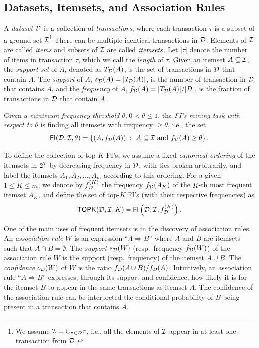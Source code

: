 \subsection{Datasets, Itemsets, and Association Rules}\label{sec:preldm}
A
\emph{dataset} ${\cal D}$ is a collection of \emph{transactions}, where each
transaction $\tau$ is a subset of a ground set ${\cal I}$\footnote{We assume
${\cal I}=\cup_{\tau\in{\cal D}} \tau$, i.e., all the elements of ${\cal I}$ appear in at
least one transaction from ${\cal D}$.} There can be multiple
identical transactions in ${\cal D}$. Elements of ${\cal I}$ are called \emph{items} and
subsets of ${\cal I}$ are called $\emph{itemsets}$. Let $|\tau|$ denote the number
of items in transaction $\tau$, which we call the \emph{length} of $\tau$. Given
an itemset $A\subseteq{\cal I}$, the \emph{support set} of $A$, denoted as
$T_{\cal D}(A)$, is the set of transactions in ${\cal D}$ that contain $A$. The
\emph{support} of $A$, $s_{\cal D}(A) =|T_{\cal D}(A)|$, is the number of transaction
in ${\cal D}$ that contains $A$, and the \emph{frequency} of $A$, $f_{\cal D}(A)=
|T_{\cal D}(A)|/|{\cal D}|$, is the fraction of transactions in ${\cal D}$ that contain
$A$.
\begin{definition}\label{def:minethreshold}
  Given a \emph{minimum frequency
  threshold} $\theta$, $0<\theta\le 1$, the \emph{FI's mining task with respect
  to $\theta$} is finding all itemsets with frequency $\geq\theta$, i.e., the
  set 
  \[ \mathsf{FI}({\cal D},{\cal I},\theta)=\left\{(A,f_{\cal D}(A)) ~:~ A \subseteq{\cal I} \mbox{ and }
  f_{{\cal D}}(A)\ge \theta\right\}.  \]
\end{definition}
  To define the collection of top-$K$ FI's, we assume a fixed \textit{canonical
  ordering} of the itemsets in $2^{\cal I}$ by decreasing frequency in ${\cal D}$, with
  ties broken arbitrarily, and label the itemsets $A_1,A_2,\dotsc,A_m$ according
  to this ordering.  For a given $1 \leq K \leq m$, we denote by
  $f^{(K)}_{\cal D}$ the frequency $f_{\cal D}(A_K)$ of the $K$-th most frequent itemset
  $A_K$, and define the set of top-$K$ FI's  (with their respective frequencies)
  as \[
  \mathsf{TOPK}({\cal D},{\cal I},K)= \mathsf{FI}\left({\cal D},{\cal I},f^{(K)}_{\cal D}\right).  \]

One of the main uses of frequent itemsets is in the discovery of
association rules.
An \emph{association rule} $W$ is an expression
  ``$A\Rightarrow B$'' where $A$ and $B$ are itemsets such that $A\cap
  B=\emptyset$. The \emph{support} $s_{\cal D}(W)$ (resp.~frequency $f_{\cal D}(W)$)
  of the association rule $W$ is the support (resp.~frequency) of the itemset
  $A\cup B$. The \emph{confidence} $c_{\cal D}(W)$ of $W$ is the ratio $f_{\cal D}(A \cup
  B)/f_{\cal D}(A)$. %
Intuitively, an association rule ``$A\Rightarrow B$'' expresses, through its
support and confidence, how likely it is for the itemset $B$ to appear in the
same transactions as itemset $A$. The confidence of the association rule
can be interpreted the conditional probability of $B$ being present in a transaction that 
contains $A$.

